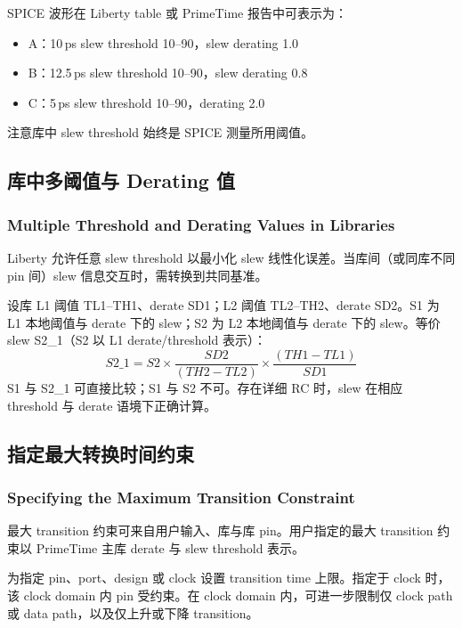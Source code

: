 
SPICE 波形在 Liberty table 或 PrimeTime 报告中可表示为：
\begin{itemize}
  \item A：10\,ps slew threshold 10--90，slew derating 1.0
  \item B：12.5\,ps slew threshold 10--90，slew derating 0.8
  \item C：5\,ps slew threshold 10--90，derating 2.0
\end{itemize}

注意库中 slew threshold 始终是 SPICE 测量所用阈值。

\subsection{库中多阈值与 Derating 值}
\subsubsection*{Multiple Threshold and Derating Values in Libraries}

Liberty 允许任意 slew threshold 以最小化 slew 线性化误差。当库间（或同库不同 pin 间）slew 信息交互时，需转换到共同基准。

设库 L1 阈值 TL1--TH1、derate SD1；L2 阈值 TL2--TH2、derate SD2。S1 为 L1 本地阈值与 derate 下的 slew；S2 为 L2 本地阈值与 derate 下的 slew。等价 slew S2\_1（S2 以 L1 derate/threshold 表示）：
\[
S2\_1 = S2 \times \frac{SD2}{(TH2 - TL2)} \times \frac{(TH1 - TL1)}{SD1}
\]
S1 与 S2\_1 可直接比较；S1 与 S2 不可。存在详细 RC 时，slew 在相应 threshold 与 derate 语境下正确计算。

\subsection{指定最大转换时间约束}
\subsubsection*{Specifying the Maximum Transition Constraint}

最大 transition 约束可来自用户输入、库与库 pin。用户指定的最大 transition 约束以 PrimeTime 主库 derate 与 slew threshold 表示。

 为指定 pin、port、design 或 clock 设置 transition time 上限。指定于 clock 时，该 clock domain 内 pin 受约束。在 clock domain 内，可进一步限制仅 clock path 或 data path，以及仅上升或下降 transition。

